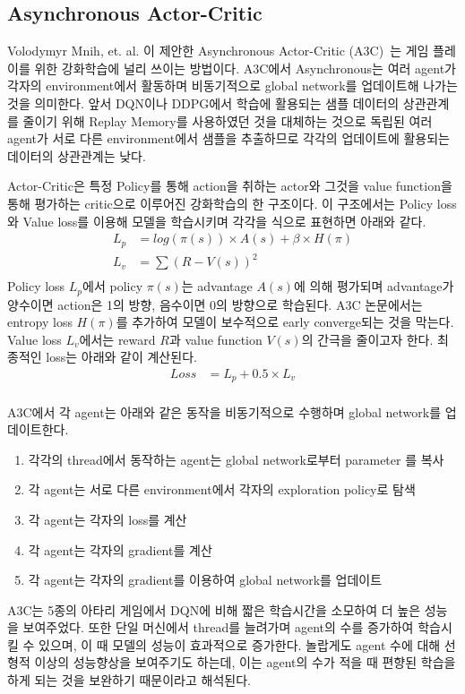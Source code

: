 \subsection{Asynchronous Actor-Critic}
Volodymyr Mnih, et. al. 이 제안한 Asynchronous Actor-Critic (A3C)~\cite{A3C}는 게임 플레이를 위한 강화학습에 널리 쓰이는 방법이다.
A3C에서 Asynchronous는 여러 agent가 각자의 environment에서 활동하며 비동기적으로 global network를 업데이트해 나가는 것을 의미한다.
앞서 DQN이나 DDPG에서 학습에 활용되는 샘플 데이터의 상관관계를 줄이기 위해 Replay Memory를 사용하였던 것을 대체하는 것으로 독립된 여러 agent가 서로 다른 environment에서 샘플을 추출하므로 각각의 업데이트에 활용되는 데이터의 상관관계는 낮다.

Actor-Critic은 특정 Policy를 통해 action을 취하는 actor와 그것을 value function을 통해 평가하는 critic으로 이루어진 강화학습의 한 구조이다.
이 구조에서는 Policy loss와 Value loss를 이용해 모델을 학습시키며 각각을 식으로 표현하면 아래와 같다.
\begin{align*}
	L_p &= log(\pi(s)) \times A(s) + \beta \times H(\pi) \\
	L_v &= \sum {(R-V(s))}^2  \\
\end{align*}
Policy loss $L_p$에서 policy $\pi(s)$는 advantage $A(s)$에 의해 평가되며 advantage가 양수이면 action은 1의 방향, 음수이면 0의 방향으로 학습된다.
A3C 논문에서는 entropy loss $H(\pi)$를 추가하여 모델이 보수적으로 early converge되는 것을 막는다.
Value loss $L_v$에서는 reward $R$과 value function $V(s)$의 간극을 줄이고자 한다.
최종적인 loss는 아래와 같이 계산된다.
\begin{align*}
	Loss &= L_p + 0.5 \times L_v \\
\end{align*}

A3C에서 각 agent는 아래와 같은 동작을 비동기적으로 수행하며 global network를 업데이트한다.
\begin{enumerate}
	\item
각각의 thread에서 동작하는 agent는 global network로부터 parameter 를 복사
	\item
각 agent는 서로 다른 environment에서 각자의 exploration policy로 탐색
	\item
각 agent는 각자의 loss를 계산
	\item
각 agent는 각자의 gradient를 계산
	\item
각 agent는 각자의 gradient를 이용하여 global network를 업데이트
\end{enumerate}

A3C는 5종의 아타리 게임에서 DQN에 비해 짧은 학습시간을 소모하여 더 높은 성능을 보여주었다.
또한 단일 머신에서 thread를 늘려가며 agent의 수를 증가하여 학습시킬 수 있으며, 이 때 모델의 성능이 효과적으로 증가한다.
놀랍게도 agent 수에 대해 선형적 이상의 성능향상을 보여주기도 하는데, 이는 agent의 수가 적을 때 편향된 학습을 하게 되는 것을 보완하기 때문이라고 해석된다. 
